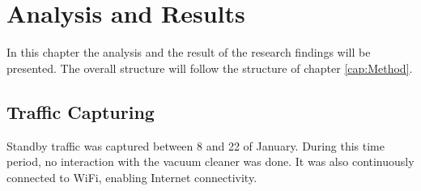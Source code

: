 \chapter{Analysis and Results}
\label{cap:AnalysisandResults}
In this chapter the analysis and the result of the research findings will be presented. The overall structure will follow the structure of chapter \ref{cap:Method}.

\section{Traffic Capturing}
Standby traffic was captured between 8 and 22  of January. During this time period, no interaction with the vacuum cleaner was done. It was also continuously connected to WiFi, enabling Internet connectivity.


